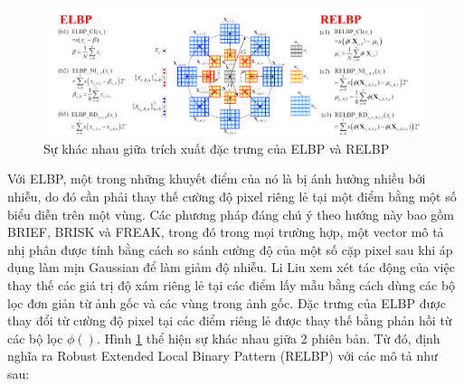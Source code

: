 \begin{figure} [h]
	\centering
	\includegraphics[width= 1\linewidth]{figures/elbpARelbp.png}
	\caption{Sự khác nhau giữa trích xuất đặc trưng của ELBP và RELBP \cite{Liu2016}}
	\label{fig:elbpARelbp}
\end{figure} 
Với ELBP, một trong những khuyết điểm của nó là bị ánh hưởng nhiều bởi nhiễu, do đó cần phải thay thế cường độ pixel riêng lẻ tại một điểm bằng một số biểu diễn trên một vùng. Các phương pháp đáng chú ý theo hướng này bao gồm BRIEF, BRISK và FREAK, trong đó trong mọi trường hợp, một vector mô tả nhị phân được tính bằng cách so sánh cường độ của một số cặp pixel sau khi áp dụng làm mịn Gaussian để làm giảm độ nhiễu. Li Liu \cite{Liu2016} xem xét tác động của việc thay thế các giá trị độ xám riêng lẻ tại các điểm lấy mẫu bằng cách dùng các bộ lọc đơn giản từ ảnh gốc và các vùng trong ảnh gốc. Đặc trưng của ELBP được thay đổi từ cường độ pixel tại các điểm riêng lẻ được thay thế bằng phản hồi từ các bộ lọc $\phi()$. Hình \ref{fig:elbpARelbp} thể hiện sự khác nhau giữa 2 phiên bản. Từ đó, định nghĩa ra Robust Extended Local Binary Pattern (RELBP) với các mô tả như sau:

